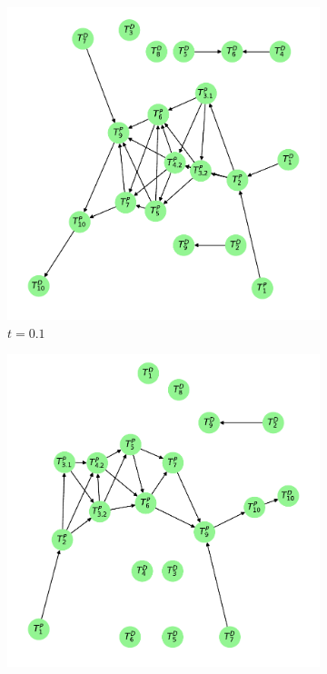 \documentclass[../Thesis.tex]{subfiles}
\begin{document}
\begin{figure}[H]
    \centering
    \begin{subfigure}[t]{0.43\linewidth}
        \includegraphics[width = \linewidth]{figures/Cycle data/G_dir times as graph - directed - 0_1.pdf}
        \caption{$t=0.1$}
        \label{subfig:G_dir times directed - graph - t 0.1}
    \end{subfigure}
    \hfill
    \begin{subfigure}[t]{0.43\linewidth}
        \includegraphics[width = \linewidth]{figures/Cycle data/G_dir times as graph - directed - 0_15.pdf}

\end{subfigure}
\end{figure}
\end{document}
